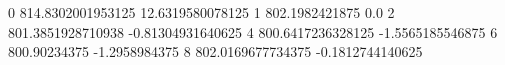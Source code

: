0 814.8302001953125 12.6319580078125
1 802.1982421875 0.0
2 801.3851928710938 -0.81304931640625
4 800.6417236328125 -1.5565185546875
6 800.90234375 -1.2958984375
8 802.0169677734375 -0.1812744140625
